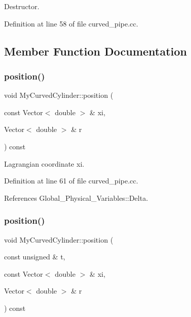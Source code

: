 Destructor. 



Definition at line 58 of file curved\+\_\+pipe.\+cc.



\subsection{Member Function Documentation}
\mbox{\label{classMyCurvedCylinder_a6b0a9178fef82a1279efded76a611692}} 
\subsubsection{\texorpdfstring{position()}{position()}\hspace{0.1cm}{\footnotesize\ttfamily [1/2]}}
{\footnotesize\ttfamily void My\+Curved\+Cylinder\+::position (\begin{DoxyParamCaption}\item[{const Vector$<$ double $>$ \&}]{xi,  }\item[{Vector$<$ double $>$ \&}]{r }\end{DoxyParamCaption}) const\hspace{0.3cm}{\ttfamily [inline]}}



Lagrangian coordinate xi. 



Definition at line 61 of file curved\+\_\+pipe.\+cc.



References Global\+\_\+\+Physical\+\_\+\+Variables\+::\+Delta.

\mbox{\label{classMyCurvedCylinder_a2752720f3a5d185264a10f9b749e5b7a}} 
\subsubsection{\texorpdfstring{position()}{position()}\hspace{0.1cm}{\footnotesize\ttfamily [2/2]}}
{\footnotesize\ttfamily void My\+Curved\+Cylinder\+::position (\begin{DoxyParamCaption}\item[{const unsigned \&}]{t,  }\item[{const Vector$<$ double $>$ \&}]{xi,  }\item[{Vector$<$ double $>$ \&}]{r }\end{DoxyParamCaption}) const\hspace{0.3cm}{\ttfamily [inline]}}

